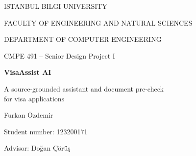 \begin{titlepage}
  \centering
  {\large ISTANBUL BILGI UNIVERSITY\par}
  {\large FACULTY OF ENGINEERING AND NATURAL SCIENCES\par}
  {\large DEPARTMENT OF COMPUTER ENGINEERING\par}
  \vspace{2.5cm}
  {\Large CMPE 491 -- Senior Design Project I\par}
  \vspace{1.5cm}
  {\huge\bfseries VisaAssist AI\par}
  \vspace{0.4cm}
  {\Large A source-grounded assistant and document pre-check\\for visa applications\par}
  \vspace{2.5cm}
  {\large Furkan Özdemir\par}
  {\large Student number: 123200171\par}
  \vspace{1.5cm}
  {\large Advisor: Doğan Çörüş\par}
  \vfill
  {\large \semester\par}
\end{titlepage}

